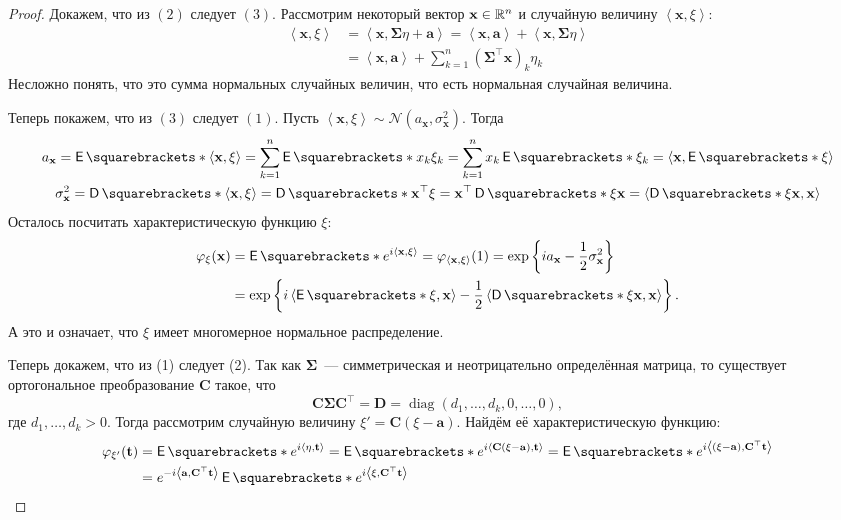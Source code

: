 \begin{proof}
	Докажем, что из \((2)\) следует \((3)\). Рассмотрим некоторый вектор \(\mathbf{x} \in \mathbb{R}^n\) и случайную величину \(\left\langle\mathbf{x}, \xi\right\rangle\):
	\begin{align*}
		\left\langle\mathbf{x}, \xi\right\rangle &= \left\langle\mathbf{x}, \mathbf{\Sigma}\eta + \mathbf{a}\right\rangle = \left\langle\mathbf{x}, \mathbf{a}\right\rangle + \left\langle\mathbf{x}, \mathbf{\Sigma}\eta\right\rangle \\
		&= \left\langle\mathbf{x}, \mathbf{a}\right\rangle + \sum_{k = 1}^{n} \left(\mathbf{\Sigma^{\top} x}\right)_{k}\eta_{k}
	\end{align*}
	Несложно понять, что это сумма нормальных случайных величин, что есть нормальная случайная величина.
	
	Теперь покажем, что из \((3)\) следует \((1)\). Пусть \(\left\langle\mathbf{x}, \xi\right\rangle \sim \mathcal{N}(a_{\mathbf{x}}, \sigma_{\mathbf{x}}^2)\). Тогда
	\begin{gather*}
		a_{\mathbf{x}} = \E{\left\langle\mathbf{x}, \xi\right\rangle} = \sum_{k = 1}^{n} \E{x_{k}\xi_{k}} = \sum_{k = 1}^{n} x_{k}\E{\xi_{k}} = \left\langle\mathbf{x}, \E{\xi}\right\rangle \\
		\sigma_{\mathbf{x}}^2 = \D{\left\langle\mathbf{x}, \xi\right\rangle} =  \D{\mathbf{x}^{\top}\xi} = \mathbf{x}^{\top}\D{\xi}\mathbf{x} = \left\langle\D{\xi}\mathbf{x}, \mathbf{x}\right\rangle
	\end{gather*}
	Осталось посчитать характеристическую функцию \(\xi\):
	\begin{align}
		\phi_{\xi}(\mathbf{x}) &= \E{e^{i\left\langle\mathbf{x}, \xi\right\rangle}} = \phi_{\left\langle\mathbf{x}, \xi\right\rangle}(1) = \exp\left\{ia_{\mathbf{x}} - \frac{1}{2}\sigma_{\mathbf{x}}^2\right\} \\
		&= \exp\left\{i\left\langle\E{\xi}, \mathbf{x}\right\rangle - \frac{1}{2}\left\langle\D{\xi}\mathbf{x}, \mathbf{x}\right\rangle\right\}.
	\end{align}
	А это и означает, что \(\xi\) имеет многомерное нормальное распределение.
	
	Теперь докажем, что из (1) следует (2). Так как \(\mathbf{\Sigma}\)~--- симметрическая и неотрицательно определённая матрица, то существует ортогональное преобразование \(\mathbf{C}\) такое, что
	\[
		\mathbf{C \Sigma C}^{\top} = \mathbf{D} = \operatorname{diag}(d_1, \dots, d_k, 0, \dots, 0),
	\]
	где \(d_1, \dots, d_k > 0\). Тогда рассмотрим случайную величину \(\xi' = \mathbf{C}(\xi - \mathbf{a})\). Найдём её характеристическую функцию:
	\begin{align*}
		\phi_{\xi'}(\mathbf{t}) &= \E{e^{i\left\langle \eta, \mathbf{t}\right\rangle}} = \E{e^{i\left\langle \mathbf{C}(\xi - \mathbf{a}), \mathbf{t}\right\rangle}} = \E{e^{i\left\langle (\xi - \mathbf{a}), \mathbf{C}^{\top}\mathbf{t}\right\rangle}} \\
		&= e^{-i\left\langle \mathbf{a}, \mathbf{C}^{\top}\mathbf{t}\right\rangle}\E{e^{i\left\langle \xi, \mathbf{C}^{\top}\mathbf{t}\right\rangle}}
	\end{align*}
	

\end{proof}
